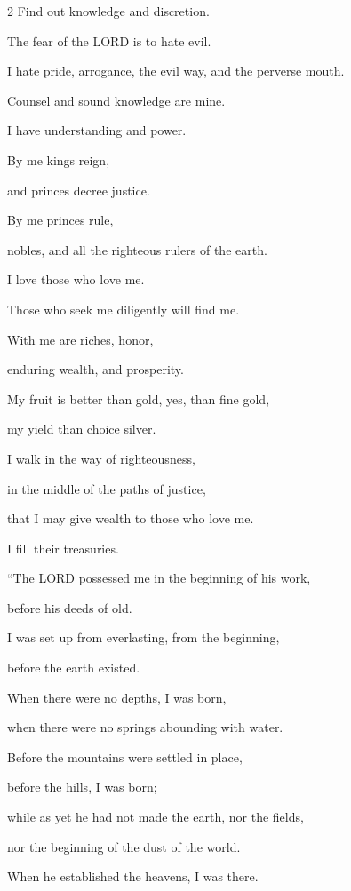 \begin{multicols}{2}
Find out knowledge and discretion.


\myverse{}The fear of the LORD is to hate evil.

I hate pride, arrogance, the evil way, and the perverse mouth.


\myverse{}Counsel and sound knowledge are mine.

I have understanding and power.


\myverse{}By me kings reign,

and princes decree justice.


\myverse{}By me princes rule,

nobles, and all the righteous rulers of the earth.


\myverse{}I love those who love me.

Those who seek me diligently will find me.


\myverse{}With me are riches, honor,

enduring wealth, and prosperity.


\myverse{}My fruit is better than gold, yes, than fine gold,

my yield than choice silver.


\myverse{}I walk in the way of righteousness,

in the middle of the paths of justice,


\myverse{}that I may give wealth to those who love me.

I fill their treasuries.


\vspace{\baselineskip} 
\myverse{}“The LORD possessed me in the beginning of his work,

before his deeds of old.


\myverse{}I was set up from everlasting, from the beginning,

before the earth existed.


\myverse{}When there were no depths, I was born,

when there were no springs abounding with water.


\myverse{}Before the mountains were settled in place,

before the hills, I was born;


\myverse{}while as yet he had not made the earth, nor the fields,

nor the beginning of the dust of the world.


\myverse{}When he established the heavens, I was there.


\end{multicols}
